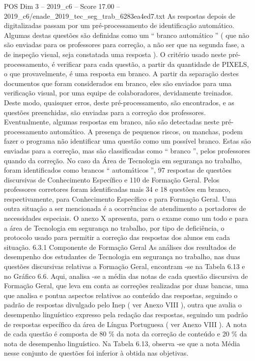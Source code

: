 \begin{textsample}{POS Dim 3 – 2019\_c6 – Score 17.00 – 2019\_c6/enade\_2019\_tec\_seg\_trab\_6283ea4ed7.txt}
As respostas depois de digitalizadas passam por um pré-processamento de identificação automático.
Algumas destas questões são definidas como um “ branco automático ” ( que não são enviadas para os professores para correção, a não ser que na segunda fase, a de inspeção visual, seja constatada uma resposta ).
O critério usado neste pré-processamento, é verificar para cada questão, a partir da quantidade de PIXELS, o que provavelmente, é uma resposta em branco.
A partir da separação destes documentos que foram considerados em branco, eles são enviados para uma verificação visual, por uma equipe de colaboradores, devidamente treinados.
Deste modo, quaisquer erros, deste pré-processamento, são encontrados, e as questões preenchidas, são enviadas para a correção dos professores.
Eventualmente, algumas respostas em branco, não são detectadas neste pré-processamento automático.
A presença de pequenos riscos, ou manchas, podem fazer o programa não identificar uma questão como um possível branco.
Estas são enviadas para a correção, mas são classificadas como “ branco ”, pelos professores quando da correção.
No caso da Área de Tecnologia em segurança no trabalho, foram identificados como brancos “ automáticos ”, 97 respostas de questões discursivas de Conhecimento Específico e 110 de Formação Geral.
Pelos professores corretores foram identificadas mais 34 e 18 questões em branco, respectivamente, para Conhecimento Específico e para Formação Geral.
Uma outra situação a ser mencionada é a ocorrências de atendimento a portadores de necessidades especiais.
O anexo X apresenta, para o exame como um todo e para a área de Tecnologia em segurança no trabalho, por tipo de deficiência, o protocolo usado para permitir a correção das respostas dos alunos em cada situação. 6.3.1 Componente de Formação Geral As análises dos resultados de desempenho dos estudantes de Tecnologia em segurança no trabalho, nas duas questões discursivas relativas a Formação Geral, encontram -se na Tabela 6.13 e no Gráfico 6.6.
Aqui, analisa -se a média das notas de cada questão discursiva de Formação Geral, que leva em conta as correções realizadas por duas bancas, uma que analisa e pontua aspectos relativos ao conteúdo das respostas, seguindo o padrão de respostas divulgado pelo Inep ( ver Anexo VIII ), outra que avalia o desempenho linguístico expresso pela redação das respostas, seguindo um padrão de respostas específico da área de Língua Portuguesa ( ver Anexo VIII ).
A nota de cada questão é composta de 80 \% da nota da correção de conteúdo e 20 \% da nota de desempenho linguístico.
Na Tabela 6.13, observa -se que a nota Média nesse conjunto de questões foi inferior à obtida nas objetivas.

\end{textsample}
